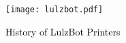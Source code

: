 %
%
%
%
%

\date {}
\thispagestyle{empty}
\begin{center}
\par
\texttt{[image: lulzbot.pdf]}
\par
\null\vfill
{\fontsize{45pt}{5cm}\selectfont \textcolor{black}{History of LulzBot Printers}}
\end{center}

